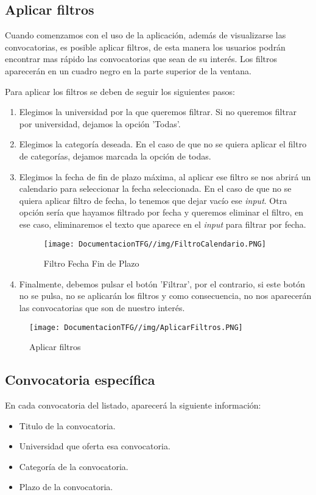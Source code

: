 \subsection{Aplicar filtros}
Cuando comenzamos con el uso de la aplicación, además de visualizarse las convocatorias, es posible aplicar filtros, de esta manera los usuarios podrán encontrar mas rápido las convocatorias que sean de su interés. Los filtros aparecerán en un cuadro negro en la parte superior de la ventana.

Para aplicar los filtros se deben de seguir los siguientes pasos:
\begin{enumerate}
   \item Elegimos la universidad por la que queremos filtrar. Si no queremos filtrar por universidad, dejamos la opción 'Todas'. 
   \item Elegimos la categoría deseada. En el caso de que no se quiera aplicar el filtro de categorías, dejamos marcada la opción de todas.
   \item Elegimos la fecha de fin de plazo máxima, al aplicar ese filtro se nos abrirá un calendario para seleccionar la fecha seleccionada. En el caso de que no se quiera aplicar filtro de fecha, lo tenemos que dejar vacío ese \textit{input}. Otra opción sería que hayamos filtrado por fecha y queremos eliminar el filtro, en ese caso, eliminaremos el texto que aparece en el \textit{input} para filtrar por fecha.
   \begin{figure}[H]
    \centering
    \texttt{[image: DocumentacionTFG//img/FiltroCalendario.PNG]}
    \caption{Filtro Fecha Fin de Plazo}
    \label{fig:filtro-calendario}
\end{figure}
   \item Finalmente, debemos pulsar el botón 'Filtrar', por el contrario, si este botón no se pulsa, no se aplicarán los filtros y como consecuencia, no nos aparecerán las convocatorias que son de nuestro interés.
\end{enumerate}

\begin{figure}[H]
    \centering
    \texttt{[image: DocumentacionTFG//img/AplicarFiltros.PNG]}
    \caption{Aplicar filtros}
    \label{fig:aplicar-filtros}
\end{figure}

\subsection{Convocatoria específica}\label{convocatoria-especifica}
En cada convocatoria del listado, aparecerá la siguiente información:
\begin{itemize}
    \item Titulo de la convocatoria.
    \item Universidad que oferta esa convocatoria.
    \item Categoría de la convocatoria.
    \item Plazo de la convocatoria.
\end{itemize}

